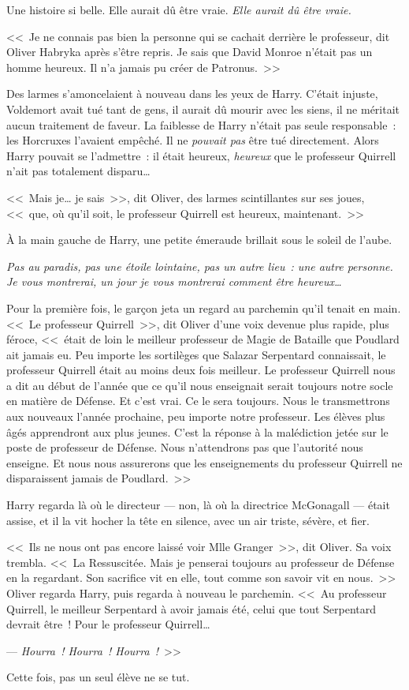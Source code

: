 Une histoire si belle. Elle aurait dû être vraie. \emph{Elle aurait dû être vraie.}

<<~Je ne connais pas bien la personne qui se cachait derrière le professeur, dit Oliver Habryka après s'être repris. Je sais que David Monroe n'était pas un homme heureux. Il n'a jamais pu créer de Patronus.~>>

Des larmes s'amoncelaient à nouveau dans les yeux de Harry. C'était injuste, Voldemort avait tué tant de gens, il aurait dû mourir avec les siens, il ne méritait aucun traitement de faveur. La faiblesse de Harry n'était pas seule responsable~: les Horcruxes l'avaient empêché. Il ne \emph{pouvait pas} être tué directement. Alors Harry pouvait se l'admettre~: il était heureux, \emph{heureux} que le professeur Quirrell n'ait pas totalement disparu…

<<~Mais je… je sais~>>, dit Oliver, des larmes scintillantes sur ses joues, <<~que, où qu'il soit, le professeur Quirrell est heureux, maintenant.~>>

À la main gauche de Harry, une petite émeraude brillait sous le soleil de l'aube.

\emph{Pas au paradis, pas une étoile lointaine, pas un autre lieu~: une autre personne. Je vous montrerai, un jour je vous montrerai comment être heureux…}

Pour la première fois, le garçon jeta un regard au parchemin qu'il tenait en main. <<~Le professeur Quirrell~>>, dit Oliver d'une voix devenue plus rapide, plus féroce, <<~était de loin le meilleur professeur de Magie de Bataille que Poudlard ait jamais eu. Peu importe les sortilèges que Salazar Serpentard connaissait, le professeur Quirrell était au moins deux fois meilleur. Le professeur Quirrell nous a dit au début de l'année que ce qu'il nous enseignait serait toujours notre socle en matière de Défense. Et c'est vrai. Ce le sera toujours. Nous le transmettrons aux nouveaux l'année prochaine, peu importe notre professeur. Les élèves plus âgés apprendront aux plus jeunes. C'est la réponse à la malédiction jetée sur le poste de professeur de Défense. Nous n'attendrons pas que l'autorité nous enseigne. Et nous nous assurerons que les enseignements du professeur Quirrell ne disparaissent jamais de Poudlard.~>>

Harry regarda là où le directeur — non, là où la directrice McGonagall — était assise, et il la vit hocher la tête en silence, avec un air triste, sévère, et fier.

<<~Ils ne nous ont pas encore laissé voir Mlle Granger~>>, dit Oliver. Sa voix trembla. <<~La Ressuscitée. Mais je penserai toujours au professeur de Défense en la regardant. Son sacrifice vit en elle, tout comme son savoir vit en nous.~>> Oliver regarda Harry, puis regarda à nouveau le parchemin. <<~Au professeur Quirrell, le meilleur Serpentard à avoir jamais été, celui que tout Serpentard devrait être~! Pour le professeur Quirrell…

--- \emph{Hourra~! Hourra~! Hourra~!}~>>

Cette fois, pas un seul élève ne se tut.
